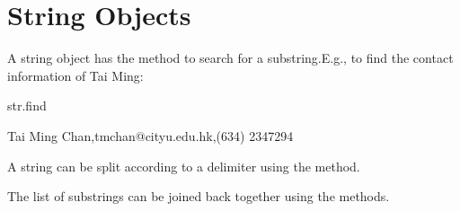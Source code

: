 \documentclass[letterpaper,10pt,english]{sphinxmanual}
\begin{document}
\section{String Objects}
\label{\detokenize{Lecture5/Objects:string-objects}}

A string object has the method  to search for a substring.E.g., to find the contact information of Tai Ming:

\begin{sphinxVerbatim}[commandchars=\\\{\}]
str.find
   
       
           
              
\end{sphinxVerbatim}

\begin{sphinxVerbatim}[commandchars=\\\{\}]
Tai Ming Chan,tmchan@cityu.edu.hk,(634) 234\PYGZhy{}7294
\end{sphinxVerbatim}


A string can be split according to a delimiter using the  method.

\begin{sphinxVerbatim}[commandchars=\\\{\}]
\end{sphinxVerbatim}

\begin{sphinxVerbatim}
\end{sphinxVerbatim}

The list of substrings can be joined back together using the  methods.
\end{document}
